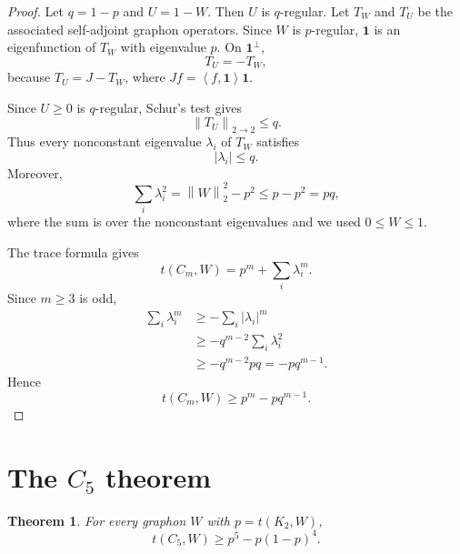\documentclass[11pt]{article}
\newtheorem{theorem}{Theorem}[section]
\newcommand{\one}{\mathbf 1}
\newcommand{\ip}[2]{\left\langle #1,#2\right\rangle}
\newcommand{\norm}[1]{\left\|#1\right\|}
\begin{document}
\begin{proof}
Let $q=1-p$ and $U=1-W$.  Then $U$ is $q$-regular.  Let $T_W$ and $T_U$ be the associated self-adjoint graphon operators.  Since $W$ is $p$-regular, $\one$ is an eigenfunction of $T_W$ with eigenvalue $p$.  On $\one^\perp$,
\[
        T_U=-T_W,
\]
because $T_U=J-T_W$, where $Jf=\ip{f}{\one}\one$.

Since $U\ge0$ is $q$-regular, Schur's test gives
\[
        \norm{T_U}_{2\to2}\le q.
\]
Thus every nonconstant eigenvalue $\lambda_i$ of $T_W$ satisfies
\[
        |\lambda_i|\le q.
\]
Moreover,
\[
        \sum_i \lambda_i^2
        =\norm{W}_2^2-p^2
        \le p-p^2=pq,
\]
where the sum is over the nonconstant eigenvalues and we used $0\le W\le1$.

The trace formula gives
\[
        t(C_m,W)=p^m+\sum_i \lambda_i^m.
\]
Since $m\ge3$ is odd,
\[
\begin{aligned}
        \sum_i\lambda_i^m
        &\ge -\sum_i |\lambda_i|^m\\
        &\ge -q^{m-2}\sum_i\lambda_i^2\\
        &\ge -q^{m-2}pq=-pq^{m-1}.
\end{aligned}
\]
Hence
\[
        t(C_m,W)\ge p^m-pq^{m-1}.
\]
\end{proof}

\section{The $C_5$ theorem}\label{sec:C5}

\begin{theorem}\label{thm:C5}
For every graphon $W$ with $p=t(K_2,W)$,
\[
        t(C_5,W)\ge p^5-p(1-p)^4.
\]
\end{theorem}
\end{document}
